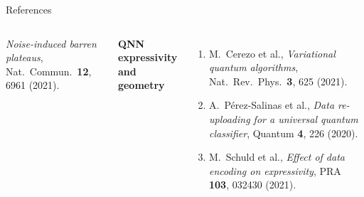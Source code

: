\documentclass[aspectratio=169,10pt]{beamer}
\begin{document}
\begin{frame}[allowframebreaks]{References}
\begin{columns}[T]
\begin{enumerate}
            \emph{Noise-induced barren plateaus},
            Nat.\ Commun.\ \textbf{12}, 6961 (2021).
    \end{enumerate}
    \textbf{QNN expressivity and geometry}
    \begin{enumerate}\scriptsize\setcounter{enumi}{10}
      \item M.\ Cerezo et al.,
            \emph{Variational quantum algorithms},
            Nat.\ Rev.\ Phys.\ \textbf{3}, 625 (2021).
      \item A.\ P\'erez-Salinas et al.,
            \emph{Data re-uploading for a universal
            quantum classifier},
            Quantum \textbf{4}, 226 (2020).
      \item M.\ Schuld et al.,
            \emph{Effect of data encoding on expressivity},
            PRA \textbf{103}, 032430 (2021).
    \end{enumerate}
  \end{columns}
\end{frame}
\end{document}
